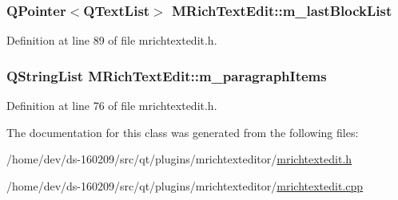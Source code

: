 \subsubsection[{m\+\_\+last\+Block\+List}]{\setlength{\rightskip}{0pt plus 5cm}Q\+Pointer$<$Q\+Text\+List$>$ M\+Rich\+Text\+Edit\+::m\+\_\+last\+Block\+List\hspace{0.3cm}{\ttfamily [protected]}}\label{class_m_rich_text_edit_ad6053d0251ea8fb0d315aa9239b26888}


Definition at line 89 of file mrichtextedit.\+h.

\hypertarget{class_m_rich_text_edit_af34c4871f9e7e840bd360f4361f71f7f}{}
\subsubsection[{m\+\_\+paragraph\+Items}]{\setlength{\rightskip}{0pt plus 5cm}Q\+String\+List M\+Rich\+Text\+Edit\+::m\+\_\+paragraph\+Items\hspace{0.3cm}{\ttfamily [protected]}}\label{class_m_rich_text_edit_af34c4871f9e7e840bd360f4361f71f7f}


Definition at line 76 of file mrichtextedit.\+h.



The documentation for this class was generated from the following files\+:\begin{DoxyCompactItemize}
\item 
/home/dev/ds-\/160209/src/qt/plugins/mrichtexteditor/\hyperlink{mrichtextedit_8h}{mrichtextedit.\+h}\item 
/home/dev/ds-\/160209/src/qt/plugins/mrichtexteditor/\hyperlink{mrichtextedit_8cpp}{mrichtextedit.\+cpp}\end{DoxyCompactItemize}
